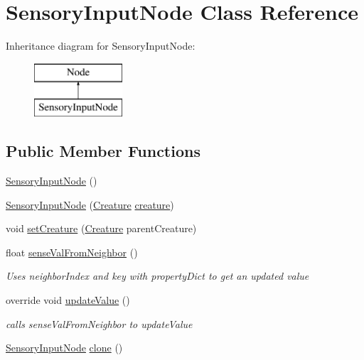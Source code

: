 \hypertarget{class_sensory_input_node}{}\section{Sensory\+Input\+Node Class Reference}
\label{class_sensory_input_node}
Inheritance diagram for Sensory\+Input\+Node\+:\begin{figure}[H]
\begin{center}
\leavevmode
\includegraphics[height=2.000000cm]{class_sensory_input_node}
\end{center}
\end{figure}
\subsection*{Public Member Functions}
\begin{DoxyCompactItemize}
\item 
\mbox{\hyperlink{class_sensory_input_node_a45013c0e606dabbdeb51cdb12f56108d}{Sensory\+Input\+Node}} ()
\item 
\mbox{\hyperlink{class_sensory_input_node_a0af1e3930af4acd24155c7887fe38043}{Sensory\+Input\+Node}} (\mbox{\hyperlink{class_creature}{Creature}} \mbox{\hyperlink{class_sensory_input_node_a2886b0729565781d8e27cbfe72726625}{creature}})
\item 
void \mbox{\hyperlink{class_sensory_input_node_a31e18eb14cbeb233c8097e53b9f6c896}{set\+Creature}} (\mbox{\hyperlink{class_creature}{Creature}} parent\+Creature)
\item 
float \mbox{\hyperlink{class_sensory_input_node_a32f65537039b935585d204770eba89eb}{sense\+Val\+From\+Neighbor}} ()
\begin{DoxyCompactList}\small\item\em Uses neighbor\+Index and key with property\+Dict to get an updated value \end{DoxyCompactList}\item 
override void \mbox{\hyperlink{class_sensory_input_node_a3db8f13a203e1e604a3b79a20153cfa7}{update\+Value}} ()
\begin{DoxyCompactList}\small\item\em calls sense\+Val\+From\+Neighbor to update\+Value \end{DoxyCompactList}\item 
\mbox{\hyperlink{class_sensory_input_node}{Sensory\+Input\+Node}} \mbox{\hyperlink{class_sensory_input_node_afc439eb6875fbc26de67e4c546d1797c}{clone}} ()
\end{DoxyCompactItemize}
